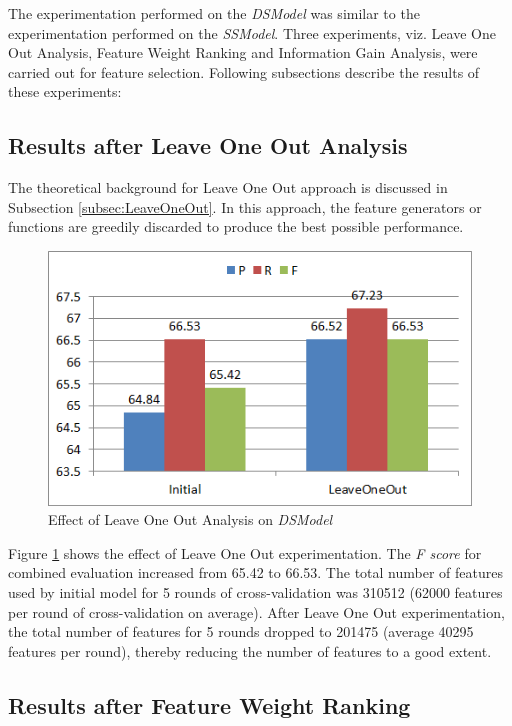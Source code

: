 The experimentation performed on the \textit{DSModel} was similar to the experimentation performed on the \textit{SSModel}. Three experiments, viz. Leave One Out Analysis, Feature Weight Ranking and Information Gain Analysis, were carried out for feature selection. Following subsections describe the results of these experiments:

\subsection{Results after Leave One Out Analysis}

The theoretical background for Leave One Out approach is discussed in Subsection \ref{subsec:LeaveOneOut}. In this approach, the feature generators or functions are greedily discarded to produce the best possible performance.

\begin{figure}
\centering
\includegraphics[scale=0.8]{figures/DSLeaveOneOutComb.png}
\caption{Effect of Leave One Out Analysis on \textit{DSModel}}\label{fig:DSLeaveOO}
\end{figure}

Figure \ref{fig:DSLeaveOO} shows the effect of Leave One Out experimentation. The \textit{F score} for combined evaluation increased from 65.42 to 66.53. The total number of features used by initial model for 5 rounds of cross-validation was 310512 (62000 features per round of cross-validation on average). After Leave One Out experimentation, the total number of features for 5 rounds dropped to 201475 (average 40295 features per round), thereby reducing the number of features to a good extent.

\subsection{Results after Feature Weight Ranking}

